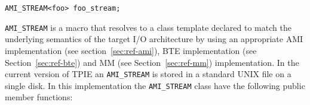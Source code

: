 \begin{verbatim}
AMI_STREAM<foo> foo_stream;
\end{verbatim}

\verb|AMI_STREAM| is a macro that resolves to a class template declared to
match the underlying semantics of the target I/O architecture by using an
appropriate AMI implementation (see section~\ref{sec:ref-ami}), BTE
implementation (see Section~\ref{sec:ref-bte})
and MM (see Section~\ref{sec:ref-mm}) implementation. In the current
version of TPIE an \verb|AMI_STREAM| is stored in a standard UNIX file on a
single disk. In this implementation the \verb|AMI_STREAM| class have the
following public member functions:



